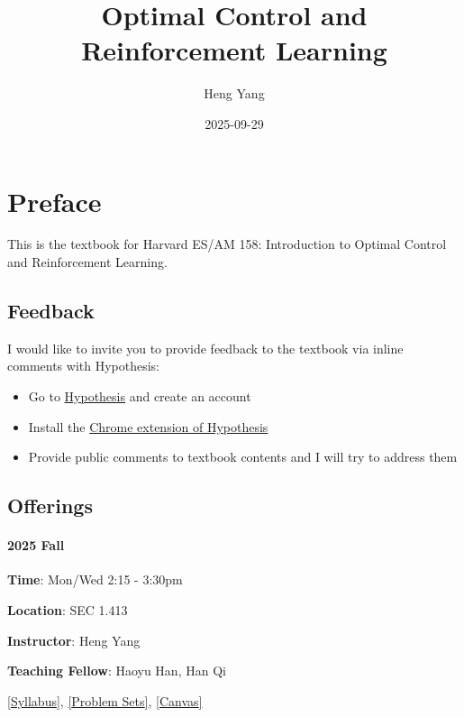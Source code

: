 \documentclass[
]{book}
\title{Optimal Control and Reinforcement Learning}
\author{Heng Yang}
\date{2025-09-29}
\theoremstyle{definition}
\theoremstyle{definition}
\theoremstyle{definition}
\theoremstyle{definition}
\theoremstyle{remark}
\begin{document}
\maketitle

{
\setcounter{tocdepth}{1}
\tableofcontents
}
\chapter*{Preface}\label{preface}

This is the textbook for Harvard ES/AM 158: Introduction to Optimal Control and Reinforcement Learning.

\section*{Feedback}\label{feedback}

I would like to invite you to provide feedback to the textbook via inline comments with Hypothesis:

\begin{itemize}
\item
  Go to \href{https://hypothes.is}{Hypothesis} and create an account
\item
  Install the \href{https://chrome.google.com/webstore/detail/hypothesis-web-pdf-annota/bjfhmglciegochdpefhhlphglcehbmek}{Chrome extension of Hypothesis}
\item
  Provide public comments to textbook contents and I will try to address them
\end{itemize}

\section*{Offerings}\label{offerings}

\subsubsection*{2025 Fall}\label{fall}

\textbf{Time}: Mon/Wed 2:15 - 3:30pm

\textbf{Location}: SEC 1.413

\textbf{Instructor}: Heng Yang

\textbf{Teaching Fellow}: Haoyu Han, Han Qi

\href{https://docs.google.com/document/d/1dIRYQZZJDx8K2q1TrodDDLg-bKJWWmj7o7yzOGlIs7o/edit?usp=sharing}{{[}Syllabus{]}}, \href{https://github.com/ComputationalRobotics/2025-ES-AM-158-PSET}{{[}Problem Sets{]}}, \href{https://canvas.harvard.edu/courses/153422}{{[}Canvas{]}}
\end{document}
